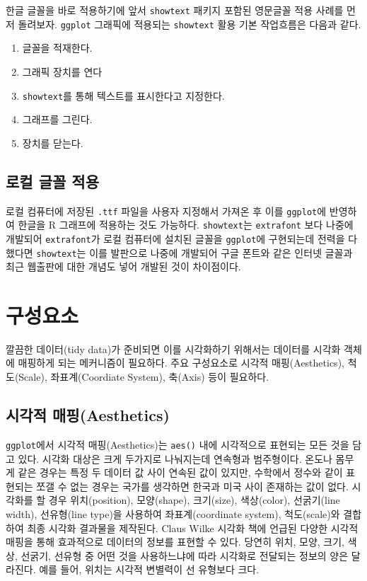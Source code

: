 \documentclass[
]{book}
\providecommand{\tightlist}{%
  \setlength{\itemsep}{0pt}\setlength{\parskip}{0pt}}
\begin{document}
한글 글꼴을 바로 적용하기에 앞서 \texttt{showtext} 패키지 포함된 영문글꼴 적용 사례를 먼저 돌려보자.
\texttt{ggplot} 그래픽에 적용되는 \texttt{showtext} 활용 기본 작업흐름은 다음과 같다.

\begin{enumerate}
\def\labelenumi{\arabic{enumi}.}
\tightlist
\item
  글꼴을 적재한다.
\item
  그래픽 장치를 연다
\item
  \texttt{showtext}를 통해 텍스트를 표시한다고 지정한다.
\item
  그래프를 그린다.
\item
  장치를 닫는다.
\end{enumerate}

\hypertarget{font-showtext-korean-example-ttf}{%
\section{로컬 글꼴 적용}\label{font-showtext-korean-example-ttf}}

로컬 컴퓨터에 저장된 \texttt{.ttf} 파일을 사용자 지정해서 가져온 후 이를
\texttt{ggplot}에 반영하여 한글을 R 그래프에 적용하는 것도 가능하다.
\texttt{showtext}는 \texttt{extrafont} 보다 나중에 개발되어 \texttt{extrafont}가
로컬 컴퓨터에 설치된 글꼴을 \texttt{ggplot}에 구현되는데 전력을 다했다면
\texttt{showtext}는 이를 발판으로 나중에 개발되어 구글 폰트와 같은
인터넷 글꼴과 최근 웹출판에 대한 개념도 넣어 개발된 것이 차이점이다.

\hypertarget{ggplot-component}{%
\chapter{구성요소}\label{ggplot-component}}

깔끔한 데이터(tidy data)가 준비되면 이를 시각화하기 위해서는 데이터를 시각화 객체에 매핑하게 되는 메커니즘이 필요하다.
주요 구성요소로 시각적 매핑(Aesthetics), 척도(Scale), 좌표계(Coordiate System), 축(Axis) 등이 필요하다.

\hypertarget{ggplot-aesthetics}{%
\section{시각적 매핑(Aesthetics)}\label{ggplot-aesthetics}}

\texttt{ggplot}에서 시각적 매핑(Aesthetics)는 \texttt{aes()} 내에 시각적으로 표현되는 모든 것을 담고 있다.
시각화 대상은 크게 두가지로 나눠지는데 연속형과 범주형이다. 온도나 몸무게 같은 경우는 특정 두 데이터 값 사이 연속된 값이 있지만,
수학에서 정수와 같이 표현되는 쪼갤 수 없는 경우는 국가를 생각하면 한국과 미국 사이 존재하는 값이 없다.
시각화를 할 경우 위치(position), 모양(shape), 크기(size), 색상(color), 선굵기(line width), 선유형(line type)을 사용하여 좌표계(coordinate system), 척도(scale)와 결합하여 최종 시각화 결과물을 제작된다. Claus Wilke 시각화 책에 언급된 다양한 시각적 매핑을 통해 효과적으로 데이터의 정보를 표현할 수 있다.\citep{wilke2019fundamentals} 당연히 위치, 모양, 크기, 색상, 선굵기, 선유형 중 어떤 것을 사용하느냐에 따라 시각화로 전달되는 정보의 양은 달라진다. 예를 들어, 위치는 시각적 변별력이 선 유형보다 크다.
\end{document}
